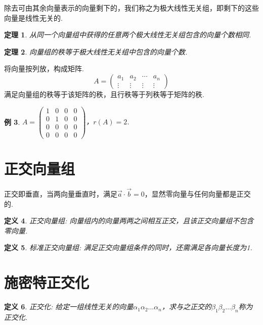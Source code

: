 \documentclass[12pt, a4paper, oneside]{ctexbook}
\newtheorem{theorem}{定理}[section]
\newtheorem{definition}[theorem]{定义}
\newtheorem{example}[theorem]{例}
\begin{document}
除去可由其余向量表示的向量剩下的，我们称之为极大线性无关组，即剩下的这些向量是线性无关的. 

\begin{theorem}
    从同一个向量组中获得的任意两个极大线性无关组包含的向量个数相同. 
\end{theorem}

\begin{theorem}
    向量组的秩等于极大线性无关组中包含的向量个数. 
\end{theorem}

将向量按列放，构成矩阵. 
$$A=\begin{pmatrix}
    a_1 & a_2 & \cdots & a_n \\
    \vdots & \vdots & \vdots & \vdots
\end{pmatrix}$$
满足向量组的秩等于该矩阵的秩，且行秩等于列秩等于矩阵的秩. 

\begin{example}
    $A=\begin{pmatrix}
        1 & 0 & 0 & 0 \\
        0 & 1 & 0 & 0 \\
        0 & 0 & 0 & 0 \\
        0 & 0 & 0 & 0
    \end{pmatrix}$，$r(A)=2$.
\end{example}

\section{正交向量组}

正交即垂直，当两向量垂直时，满足$\vec a \cdot \vec b = 0$，显然零向量与任何向量都是正交的. 


\begin{definition}
    正交向量组: 向量组内的向量两两之间相互正交，且该正交向量组不包含零向量. 
\end{definition}

\begin{definition}
    标准正交向量组: 满足正交向量组条件的同时，还需满足各向量长度为1. 
\end{definition}

\section{施密特正交化}

\begin{definition}
    正交化: 给定一组线性无关的向量$\alpha_1 \alpha_2 \dots \alpha_n$，求与之正交的$\beta_1 \beta_2 \dots \beta_n$称为正交化. 
\end{definition}
\end{document}
